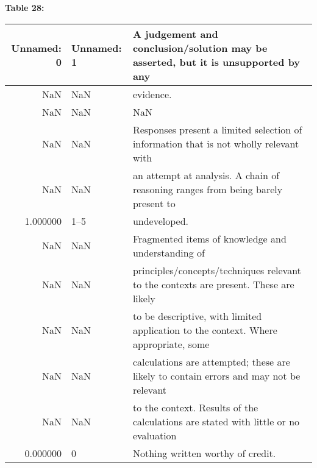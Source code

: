 \documentclass{article}
\begin{document}
\textbf{Table 28:}
\begin{tabular}{rll}
\toprule
Unnamed: 0 & Unnamed: 1 & A judgement and conclusion/solution may be asserted, but it is unsupported by any \\
\midrule
NaN & NaN & evidence. \\
NaN & NaN & NaN \\
NaN & NaN & Responses present a limited selection of information that is not wholly relevant with \\
NaN & NaN & an attempt at analysis.  A chain of reasoning ranges from being barely present to \\
1.000000 & 1–5 & undeveloped. \\
NaN & NaN & Fragmented items of knowledge and understanding of \\
NaN & NaN & principles/concepts/techniques relevant to the contexts are present.  These are likely \\
NaN & NaN & to be descriptive, with limited application to the context.  Where appropriate, some \\
NaN & NaN & calculations are attempted; these are likely to contain errors and may not be relevant \\
NaN & NaN & to the context.  Results of the calculations are stated with little or no evaluation \\
0.000000 & 0 & Nothing written worthy of credit. \\
\bottomrule
\end{tabular}


    
\end{document}
